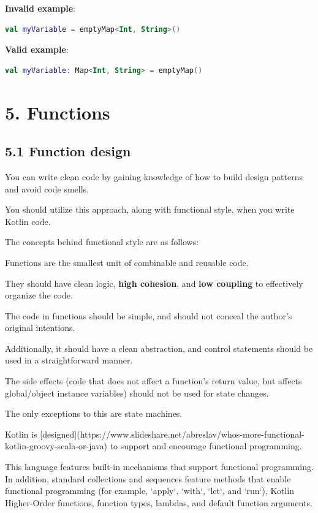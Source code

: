 {{{{\textbf{Invalid example}:

\begin{lstlisting}[language=Kotlin]
val myVariable = emptyMap<Int, String>() 
\end{lstlisting}


\textbf{Valid example}:

\begin{lstlisting}[language=Kotlin]
val myVariable: Map<Int, String> = emptyMap() 
\end{lstlisting}
\section*{\textbf{5. Functions}}

\subsection*{\textbf{5.1 Function design}}

You can write clean code by gaining knowledge of how to build design patterns and avoid code smells.

You should utilize this approach, along with functional style, when you write Kotlin code. 

The concepts behind functional style are as follows: 

Functions are the smallest unit of combinable and reusable code.

They should have clean logic, \textbf{high cohesion}, and \textbf{low coupling} to effectively organize the code.

The code in functions should be simple, and should not conceal the author's original intentions.

Additionally, it should have a clean abstraction, and control statements should be used in a straightforward manner.

The side effects (code that does not affect a function's return value, but affects global/object instance variables) should not be used for state changes.

The only exceptions to this are state machines.



Kotlin is [designed](https://www.slideshare.net/abreslav/whos-more-functional-kotlin-groovy-scala-or-java) to support and encourage functional programming.

This language features built-in mechanisms that support functional programming. In addition, standard collections and sequences feature methods that enable functional programming (for example, `apply`, `with`, `let`, and `run`), Kotlin Higher-Order functions, function types, lambdas, and default function arguments.

}}}}
